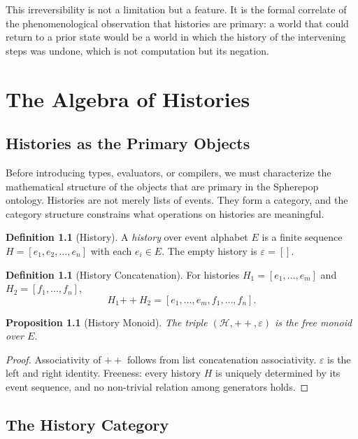 \documentclass[12pt, a4paper, openany]{book}
\theoremstyle{plain}
\newtheorem{proposition}[theorem]{Proposition}
\theoremstyle{definition}
\newtheorem{definition}[theorem]{Definition}
\theoremstyle{remark}
\newcommand{\calH}{\mathcal{H}}
\begin{document}
This irreversibility is not a limitation but a feature. It is the formal
correlate of the phenomenological observation that histories are primary: a world
that could return to a prior state would be a world in which the history of
the intervening steps was undone, which is not computation but its negation.

\chapter{The Algebra of Histories}

\section{Histories as the Primary Objects}

Before introducing types, evaluators, or compilers, we must characterize the
mathematical structure of the objects that are primary in the Spherepop ontology.
Histories are not merely lists of events. They form a category, and the category
structure constrains what operations on histories are meaningful.

\begin{definition}[History]
A \emph{history} over event alphabet $E$ is a finite sequence
$H = [e_1, e_2, \ldots, e_n]$ with each $e_i \in E$. The empty history is
$\varepsilon = []$.
\end{definition}

\begin{definition}[History Concatenation]
For histories $H_1 = [e_1, \ldots, e_m]$ and $H_2 = [f_1, \ldots, f_n]$,
\[
H_1 \mathbin{++} H_2 = [e_1, \ldots, e_m, f_1, \ldots, f_n].
\]
\end{definition}

\begin{proposition}[History Monoid]
The triple $(\calH, \mathbin{++}, \varepsilon)$ is the free monoid over $E$.
\end{proposition}

\begin{proof}
Associativity of $\mathbin{++}$ follows from list concatenation associativity.
$\varepsilon$ is the left and right identity. Freeness: every history $H$ is
uniquely determined by its event sequence, and no non-trivial relation among
generators holds.
\end{proof}

\section{The History Category}
\end{document}
